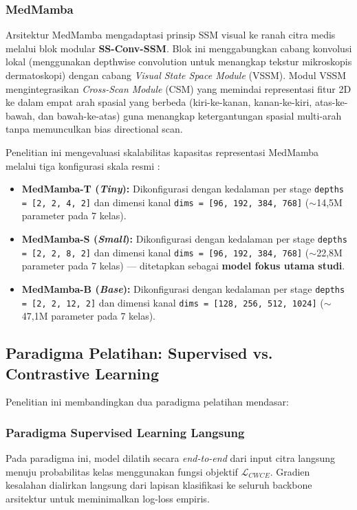 \subsubsection{MedMamba}
Arsitektur MedMamba \cite{yue2024medmamba} mengadaptasi prinsip SSM visual ke ranah citra medis melalui blok modular \textbf{SS-Conv-SSM}. Blok ini menggabungkan cabang konvolusi lokal (menggunakan depthwise convolution untuk menangkap tekstur mikroskopis dermatoskopi) dengan cabang \textit{Visual State Space Module} (VSSM). Modul VSSM mengintegrasikan \textit{Cross-Scan Module} (CSM) \cite{liu2024vmamba} yang memindai representasi fitur 2D ke dalam empat arah spasial yang berbeda (kiri-ke-kanan, kanan-ke-kiri, atas-ke-bawah, dan bawah-ke-atas) guna menangkap ketergantungan spasial multi-arah tanpa memunculkan bias directional scan. \par

Penelitian ini mengevaluasi skalabilitas kapasitas representasi MedMamba melalui tiga konfigurasi skala resmi \cite{yue2024medmamba}:
\begin{itemize}[noitemsep]
	\item \textbf{MedMamba-T (\textit{Tiny}):} Dikonfigurasi dengan kedalaman per stage \texttt{depths = [2, 2, 4, 2]} dan dimensi kanal \texttt{dims = [96, 192, 384, 768]} ($\sim$14,5M parameter pada 7 kelas).
	\item \textbf{MedMamba-S (\textit{Small}):} Dikonfigurasi dengan kedalaman per stage \texttt{depths = [2, 2, 8, 2]} dan dimensi kanal \texttt{dims = [96, 192, 384, 768]} ($\sim$22,8M parameter pada 7 kelas) --- ditetapkan sebagai \textbf{model fokus utama studi}.
	\item \textbf{MedMamba-B (\textit{Base}):} Dikonfigurasi dengan kedalaman per stage \texttt{depths = [2, 2, 12, 2]} dan dimensi kanal \texttt{dims = [128, 256, 512, 1024]} ($\sim$47,1M parameter pada 7 kelas).
\end{itemize}

\subsection{Paradigma Pelatihan: Supervised vs. Contrastive Learning} \label{II.Teori.Pelatihan}
Penelitian ini membandingkan dua paradigma pelatihan mendasar:

\subsubsection{Paradigma Supervised Learning Langsung}
Pada paradigma ini, model dilatih secara \textit{end-to-end} dari input citra langsung menuju probabilitas kelas menggunakan fungsi objektif $\mathcal{L}_{CWCE}$. Gradien kesalahan dialirkan langsung dari lapisan klasifikasi ke seluruh backbone arsitektur untuk meminimalkan log-loss empiris.

